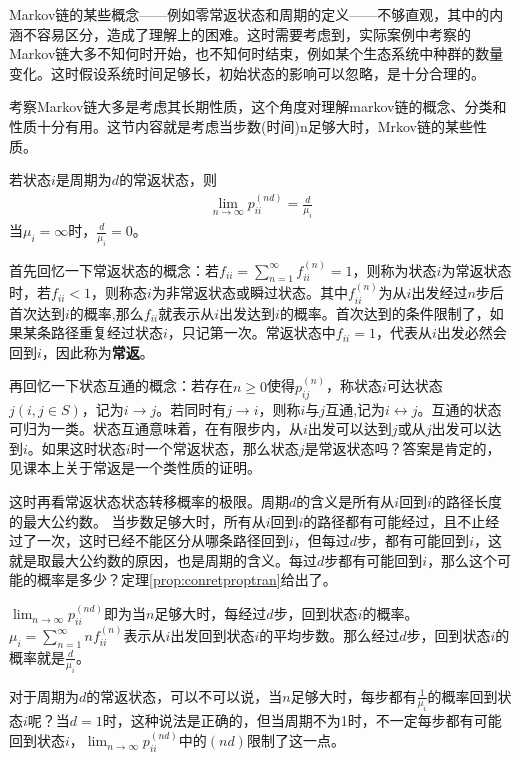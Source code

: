 Markov链的某些概念——例如零常返状态和周期的定义——不够直观，其中的内涵不容易区分，造成了理解上的困难。这时需要考虑到，实际案例中考察的Markov链大多不知何时开始，也不知何时结束，例如某个生态系统中种群的数量变化。这时假设系统时间足够长，初始状态的影响可以忽略，是十分合理的。

考察Markov链大多是考虑其长期性质，这个角度对理解markov链的概念、分类和性质十分有用。这节内容就是考虑当步数(时间)n足够大时，Mrkov链的某些性质。

\begin{theorem}\label{prop:conretproptran}
	若状态\(i\)是周期为\(d\)的常返状态，则
	\begin{align*}
		\lim_{n\to \infty}p_{ii}^{(nd)}=\frac{d}{\mu_i}
	\end{align*}
	当\(\mu_i=\infty\)时，\(\frac{d}{\mu_i}=0\)。
\end{theorem}

首先回忆一下常返状态的概念：若\(f_{ii}=\sum_{n=1}^{\infty}f_{ii}^{(n)}=1\)，则称为状态\(i\)为常返状态时，若\(f_{ii}<1\)，则称态\(i\)为非常返状态或瞬过状态。其中\(f_{ii}^{(n)}\)为从\(i\)出发经过\(n\)步后首次达到\(i\)的概率,那么\(f_{ii}\)就表示从\(i\)出发达到\(i\)的概率。首次达到的条件限制了，如果某条路径重复经过状态\(i\)，只记第一次。常返状态中\(f_{ii}=1\)，代表从\(i\)出发必然会回到\(i\)，因此称为\textbf{常返}。

再回忆一下状态互通的概念：若存在\(n\geqslant 0\)使得\(p_{ij}^{(n)}\)，称状态\(i\)可达状态\(j(i,j\in S)\)，记为\(i\rightarrow j\)。若同时有\(j\rightarrow i\)，则称\(i\)与\(j\)互通,记为\(i\leftrightarrow j\)。互通的状态可归为一类。状态互通意味着，在有限步内，从\(i\)出发可以达到\(j\)或从\(j\)出发可以达到\(i\)。如果这时状态\(i\)时一个常返状态，那么状态\(j\)是常返状态吗？答案是肯定的，见课本上关于常返是一个类性质的证明。

这时再看常返状态状态转移概率的极限。周期\(d\)的含义是所有从\(i\)回到\(i\)的路径长度的最大公约数。
当步数足够大时，所有从\(i\)回到\(i\)的路径都有可能经过，且不止经过了一次，这时已经不能区分从哪条路径回到\(i\)，但每过\(d\)步，都有可能回到\(i\)，这就是取最大公约数的原因，也是周期的含义。每过\(d\)步都有可能回到\(i\)，那么这个可能的概率是多少？定理\ref{prop:conretproptran}给出了。

\(\lim_{n\to \infty}p_{ii}^{(nd)}\)即为当\(n\)足够大时，每经过\(d\)步，回到状态\(i\)的概率。\(\mu_i=\sum_{n=1}^{\infty}nf_{ii}^{(n)}\)表示从\(i\)出发回到状态\(i\)的平均步数。那么经过\(d\)步，回到状态\(i\)的概率就是\(\frac{d}{\mu_i}\)。

对于周期为\(d\)的常返状态，可以不可以说，当\(n\)足够大时，每步都有\(\frac{1}{\mu_i}\)的概率回到状态\(i\)呢？当\(d=1\)时，这种说法是正确的，但当周期不为1时，不一定每步都有可能回到状态\(i\)，\(\lim_{n\to \infty}p_{ii}^{(nd)}\)中的\((nd)\)限制了这一点。

